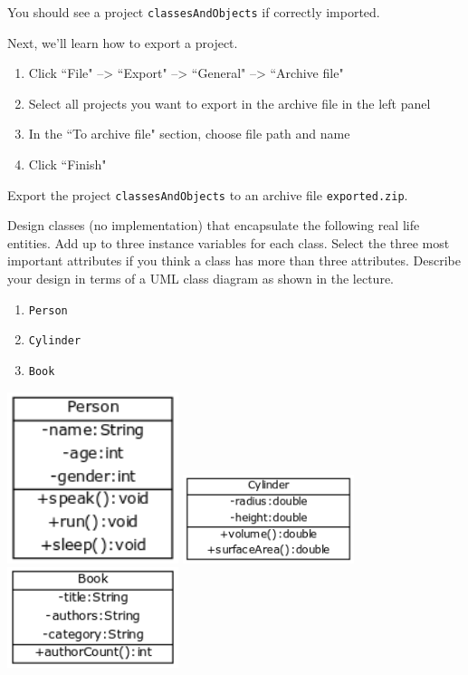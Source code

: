 \begin{questions}
You should see a project \texttt{classesAndObjects} if correctly imported.

Next, we'll learn how to export a project.

\begin{enumerate}
\item Click ``File" --> ``Export" --> ``General" --> ``Archive file"
\item Select all projects you want to export in the archive file in the left panel
\item In the ``To archive file" section, choose file path and name
\item Click ``Finish"
\end{enumerate}

Export the project \texttt{classesAndObjects} to an archive file \texttt{exported.zip}.

\newpage
\question Design classes (no implementation) that encapsulate the following real life entities. Add up to three instance variables for each class. Select the three most important attributes if you think a class has more than three attributes. Describe your design in terms of a UML class diagram as shown in the lecture.

\begin{enumerate}
\item \texttt{Person}
\item \texttt{Cylinder}
\item \texttt{Book}
\end{enumerate}

\begin{solution}
\includegraphics[width=5cm]{Person.png}
\vskip 0.5cm
\includegraphics[width=5cm]{Cylinder.png}
\vskip 0.5cm
\includegraphics[width=5cm]{Book.png}
\vskip 0.5cm
\end{solution}


\end{questions}
